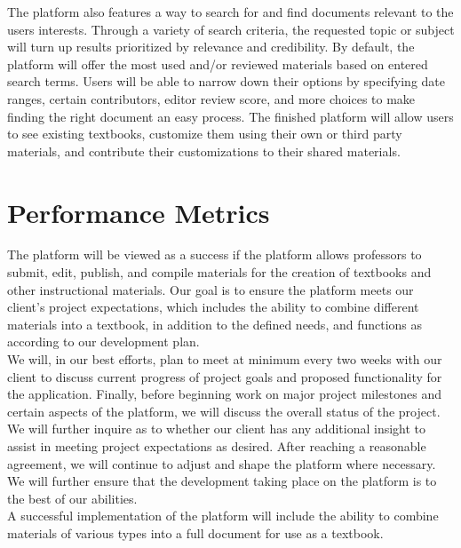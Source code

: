 \documentclass[onecolumn, draftclsnofoot,10pt, compsoc]{IEEEtran}
\begin{document}
\noindent The platform also features a way to search for and find 
documents relevant to the users interests. 
Through a variety of search criteria, the requested topic or subject will
turn up results prioritized by relevance and credibility. By default, the 
platform will offer the most used and/or reviewed materials
based on entered search terms. Users will be able to narrow down their 
options by specifying date ranges, certain contributors, editor review 
score, and more choices to make finding the right document an easy 
process. 
The finished platform will allow users to see existing 
textbooks, customize them using their own or third party materials, and 
contribute their customizations to their shared materials. \\

\section{Performance Metrics}

\noindent The platform will be viewed as a success if the platform 
allows professors to submit, edit, publish, and compile materials for 
the creation of textbooks and other instructional materials. 
Our goal is to ensure the platform meets our client's project 
expectations, which includes the ability to combine different materials
into a textbook, in addition to the defined needs, 
and functions as according to our development plan. \\

\noindent We will, in our best efforts, plan to meet at minimum every two weeks 
with our client to discuss current progress of project goals and 
proposed functionality for the application. 
Finally, before beginning work on major project milestones and certain 
aspects of the platform, we will discuss the overall status of the 
project. We will further inquire as to whether our client has any additional 
insight to assist in meeting project expectations as desired. 
After reaching a reasonable agreement, we will continue to adjust and 
shape the platform where necessary. 
We will further ensure that the development taking place on the platform 
is to the best of our abilities.\\

\noindent A successful implementation of the platform will include the ability 
to combine materials of various types into a full document for use as a textbook.
\end{document}
